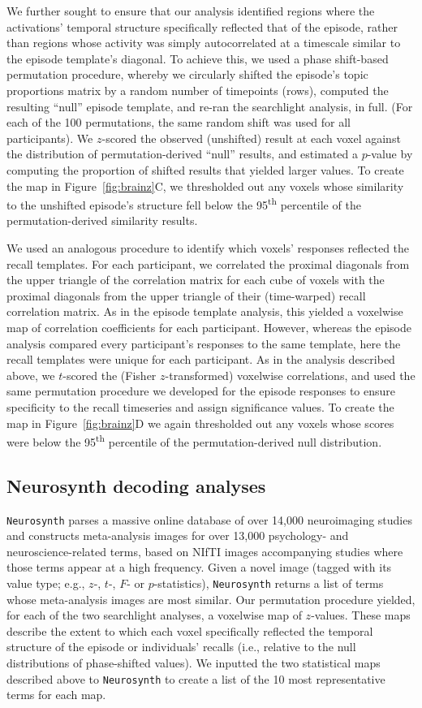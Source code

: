 \documentclass[10pt]{article}
\begin{document}
We further sought to ensure that our analysis identified regions where the activations’ temporal structure specifically reflected that of the episode, rather than regions whose activity was simply autocorrelated at a timescale similar to the episode template’s diagonal.  To achieve this, we used a phase shift-based permutation procedure, whereby we circularly shifted the episode’s topic proportions matrix by a random number of timepoints (rows), computed the resulting ``null'' episode template, and re-ran the searchlight analysis, in full.  (For each of the 100 permutations, the same random shift was used for all participants).  We $z$-scored the observed (unshifted) result at each voxel against the distribution of permutation-derived ``null'' results, and estimated a $p$-value by computing the proportion of shifted results that yielded larger values.  To create the map in Figure~\ref{fig:brainz}C, we thresholded out any voxels whose similarity to the unshifted episode’s structure fell below the 95\textsuperscript{th} percentile of the permutation-derived similarity results.

We used an analogous procedure to identify which voxels' responses reflected the recall templates.  For each participant, we correlated the proximal diagonals from the upper triangle of the correlation matrix for each cube of voxels with the proximal diagonals from the upper triangle of their (time-warped) recall correlation matrix.  As in the episode template analysis, this yielded a voxelwise map of correlation coefficients for each participant.  However, whereas the episode analysis compared every participant's responses to the same template, here the recall templates were unique for each participant.  As in the analysis described above, we $t$-scored the (Fisher $z$-transformed) voxelwise correlations, and used the same permutation procedure we developed for the episode responses to ensure specificity to the recall timeseries and assign significance values.  To create the map in Figure~\ref{fig:brainz}D we again thresholded out any voxels whose scores were below the 95\textsuperscript{th} percentile of the permutation-derived null distribution.

\subsection*{Neurosynth decoding analyses}
\texttt{Neurosynth} parses a massive online database of over 14,000 neuroimaging studies and constructs meta-analysis images for over 13,000 psychology- and neuroscience-related terms, based on NIfTI images accompanying studies where those terms appear at a high frequency.  Given a novel image (tagged with its value type; e.g., $z$-, $t$-, $F$- or $p$-statistics), \texttt{Neurosynth} returns a list of terms whose meta-analysis images are most similar.  Our permutation procedure yielded, for each of the two searchlight analyses, a voxelwise map of $z$-values.  These maps describe the extent to which each voxel specifically reflected the temporal structure of the episode or individuals' recalls (i.e., relative to the null distributions of phase-shifted values). We inputted the two statistical maps described above to \texttt{Neurosynth} to create a list of the 10 most representative terms for each map.
\end{document}
